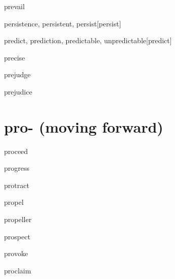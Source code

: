 \begin{RefWord}{prevail}
\end{RefWord}

\begin{RefWord}{persistence, persistent, persist}[persist]
\end{RefWord}




\begin{RefWord}{predict, prediction, predictable, unpredictable}[predict]
\end{RefWord}

\begin{RefWord}{precise}
\end{RefWord}

\begin{RefWord}{prejudge}
\end{RefWord}

\begin{RefWord}{prejudice}
\end{RefWord}

\section{pro- (moving forward)}

\begin{RefWord}{proceed}
\end{RefWord}

\begin{RefWord}{progress}
\end{RefWord}

\begin{RefWord}{protract}
\end{RefWord}

\begin{RefWord}{propel}
\end{RefWord}

\begin{RefWord}{propeller}
\end{RefWord}

\begin{RefWord}{prospect}
\end{RefWord}

\begin{RefWord}{provoke}
\end{RefWord}

\begin{RefWord}{proclaim}
\end{RefWord}

